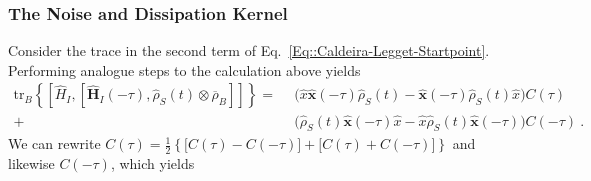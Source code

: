 	\subsubsection{The Noise and Dissipation Kernel}
	 Consider the trace in the second term of Eq.~\eqref{Eq::Caldeira-Legget-Startpoint}. Performing analogue steps to the calculation above yields
	\begin{equation}
		\begin{split} \label{Eq::Trace-kernel-startpoint}
			 \text{tr}_B \left\{  \left[{\hat{H}}_I, \left[{\boldsymbol{\hat{H}}}_I(- \tau), {\hat{\rho}}_S(t) \otimes \overline{\rho}_B \right]\right]  \right\} =	~~  &\Big (\hat{x} \boldsymbol{\hat{x}}(-\tau) \hat{\rho}_S(t) - \boldsymbol{\hat{x}}(-\tau) \hat{\rho}_S(t) \hat{x}   \Big)  C(\tau) \\
			+& \Big (  \hat{\rho}_S(t) \boldsymbol{\hat{x}}(-\tau) \hat{x}  - \hat{x} \hat{\rho}_S(t) \boldsymbol{\hat{x}}(-\tau)    \Big) C(-\tau)~.
		\end{split}
	\end{equation}
	We can rewrite $C(\tau) = \frac{1}{2}	\left\{ \Big[C(\tau) - C(-\tau) \Big]  + \Big[C(\tau) + C(-\tau)\Big] \right\}$ and likewise $C(-\tau)$, which yields
